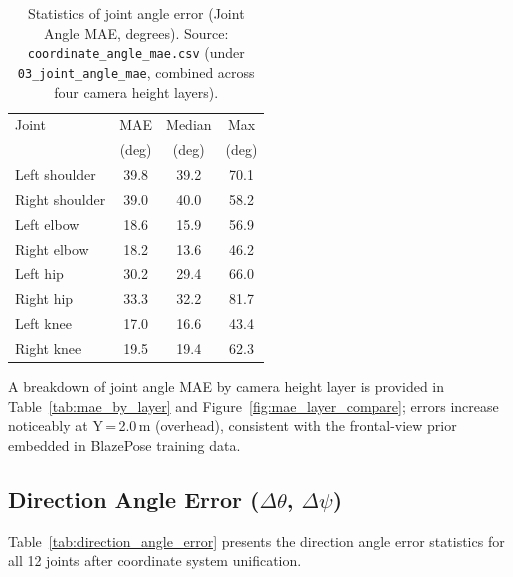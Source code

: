 \documentclass[english,fleqn]{ieej-e}
\begin{document}
\begin{table}[!t]
\centering
\caption{Statistics of joint angle error (Joint Angle MAE, degrees).
  Source: \texttt{coordinate\_angle\_mae.csv} (under \texttt{03\_joint\_angle\_mae},
  combined across four camera height layers).}
\label{tab:joint_angle_error}
\begin{tabular}{lccc}
\toprule
Joint          & MAE    & Median & Max    \\
               & (deg)  & (deg)  & (deg)  \\
\midrule
Left shoulder  & 39.8   & 39.2   & 70.1   \\
Right shoulder & 39.0   & 40.0   & 58.2   \\
Left elbow     & 18.6   & 15.9   & 56.9   \\
Right elbow    & 18.2   & 13.6   & 46.2   \\
Left hip       & 30.2   & 29.4   & 66.0   \\
Right hip      & 33.3   & 32.2   & 81.7   \\
Left knee      & 17.0   & 16.6   & 43.4   \\
Right knee     & 19.5   & 19.4   & 62.3   \\
\bottomrule
\end{tabular}
\end{table}

A breakdown of joint angle MAE by camera height layer is provided in
Table~\ref{tab:mae_by_layer} and Figure~\ref{fig:mae_layer_compare};
errors increase noticeably at Y\,=\,2.0\,m (overhead), consistent with
the frontal-view prior embedded in BlazePose training data.

\subsection{Direction Angle Error ($\Delta\theta$, $\Delta\psi$)}

Table~\ref{tab:direction_angle_error} presents the direction angle error
statistics for all 12 joints after coordinate system unification.
\end{document}
